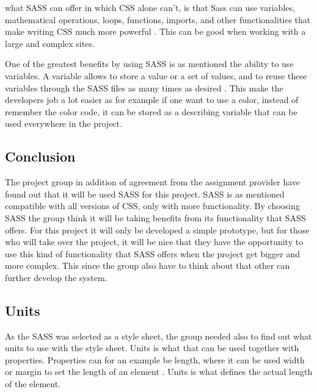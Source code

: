 what SASS can offer in which 
CSS alone can't, is that Sass can use variables, mathematical operations, loops, functions, imports, and other  functionalities that make writing CSS much more powerful \cite{Sass_3}. 
This can be good when working with a large and complex sites.

One of the greatest benefits 
by using SASS is as mentioned the ability to use variables. A variable allows to store a value or a set of values, and to reuse these variables through the SASS files as many times as desired \cite{Sass_3}. 
This make the developers job a lot easier as for example if one want to use a color, instead of remember the color code, it can be stored as a describing variable that can be used everywhere in the project.

\subsection{Conclusion}
The project group in addition of agreement from the assignment provider have found out that it will be used SASS for this project. SASS is as mentioned compatible with all versions of CSS, only with more functionality. By choosing SASS the group think it will be taking benefits from its functionality that SASS offers. For this project it will only be developed a simple prototype, but for 
those who will take over the project, it will be nice that they have the opportunity to use this kind of functionality that SASS offers when the project get bigger and more complex. This since the group also have to think about that other can further develop the system.

\subsection{Units}
As the SASS was selected as a style sheet, the group needed also to find out what units to use with the style sheet. Units is what that can be used together with properties. Properties can for an example be length, where it can be used width or margin to set the length of an element \cite{Units_1}. 
Units is what defines the actual length of the element.

